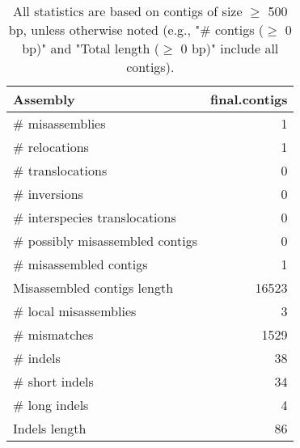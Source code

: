 \documentclass[12pt,a4paper]{article}
\begin{document}
\begin{table}[ht]
\begin{center}
\caption{All statistics are based on contigs of size $\geq$ 500 bp, unless otherwise noted (e.g., "\# contigs ($\geq$ 0 bp)" and "Total length ($\geq$ 0 bp)" include all contigs).}
\begin{tabular}{|l*{1}{|r}|}
\hline
Assembly & final.contigs \\ \hline
\# misassemblies & 1 \\ \hline
\hspace{5mm}\# relocations & 1 \\ \hline
\hspace{5mm}\# translocations & 0 \\ \hline
\hspace{5mm}\# inversions & 0 \\ \hline
\hspace{5mm}\# interspecies translocations & 0 \\ \hline
\# possibly misassembled contigs & 0 \\ \hline
\# misassembled contigs & 1 \\ \hline
Misassembled contigs length & 16523 \\ \hline
\# local misassemblies & 3 \\ \hline
\# mismatches & 1529 \\ \hline
\# indels & 38 \\ \hline
\hspace{5mm}\# short indels & 34 \\ \hline
\hspace{5mm}\# long indels & 4 \\ \hline
Indels length & 86 \\ \hline
\end{tabular}
\end{center}
\end{table}
\end{document}
